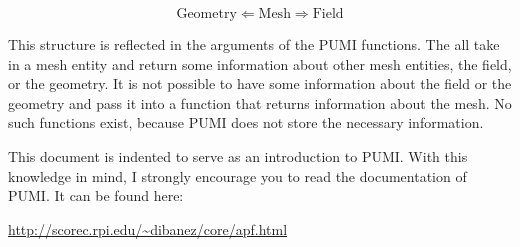 \documentclass[12pt]{article}
\begin{document}
$$ \text{Geometry} \Leftarrow \text{Mesh} \Rightarrow \text{Field} $$

This structure is reflected in the arguments of the PUMI functions.  The all take in a mesh entity and return some information about other mesh entities, the field, or the geometry.  
It is not possible to have some information about the field or the geometry and pass it into a function that returns information about the mesh.  No such functions exist, because PUMI does not store the necessary information.

This document is indented to serve as an introduction to PUMI.  With this knowledge in mind, I strongly encourage you to read the documentation of PUMI.  It can be found here:
\newline


\href{http://scorec.rpi.edu/~dibanez/core/apf.html}{http://scorec.rpi.edu/\textasciitilde dibanez/core/apf.html}
\end{document}
